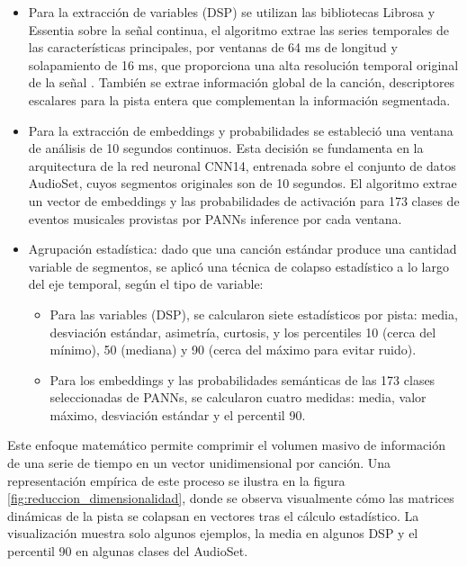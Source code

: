 \begin{itemize}
    \item Para la extracción de variables (DSP) se utilizan las bibliotecas Librosa y Essentia sobre la señal continua, el algoritmo extrae las series temporales de las características principales, por ventanas de 64 ms de longitud y solapamiento de 16 ms, que proporciona una alta resolución temporal original de la señal \cite{muller2015fundamentals, lerch2012introduction}. También se extrae información global de la canción, descriptores escalares para la pista entera que complementan la información segmentada.
    \item Para la extracción de embeddings y probabilidades se estableció una ventana de análisis de 10 segundos continuos. Esta decisión se fundamenta en la arquitectura de la red neuronal CNN14, entrenada sobre el conjunto de datos AudioSet, cuyos segmentos originales son de 10 segundos. El algoritmo extrae un vector de embeddings y las probabilidades de activación para 173 clases de eventos musicales provistas por PANNs inference por cada ventana.
    \item Agrupación estadística: dado que una canción estándar produce una cantidad variable de segmentos, se aplicó una técnica de colapso estadístico a lo largo del eje temporal, según el tipo de variable:
    \begin{itemize}
        \item Para las variables (DSP), se calcularon siete estadísticos por pista: media, desviación estándar, asimetría, curtosis, y los percentiles 10 (cerca del mínimo), 50 (mediana) y 90 (cerca del máximo para evitar ruido).
        \item Para los embeddings y las probabilidades semánticas de las 173 clases seleccionadas de PANNs, se calcularon cuatro medidas: media, valor máximo, desviación estándar y el percentil 90.
    \end{itemize}
\end{itemize}

Este enfoque matemático permite comprimir el volumen masivo de información de una serie de tiempo en un vector unidimensional por canción. Una representación empírica de este proceso se ilustra en la figura \ref{fig:reduccion_dimensionalidad}, donde se observa visualmente cómo las matrices dinámicas de la pista se colapsan en vectores tras el cálculo estadístico. La visualización muestra solo algunos ejemplos, la media en algunos DSP y el percentil 90 en algunas clases del AudioSet.

